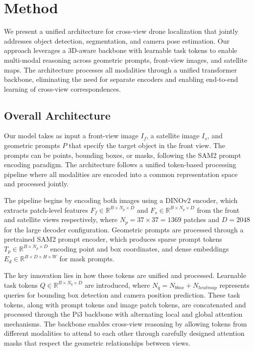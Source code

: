 \section{Method}

We present a unified architecture for cross-view drone localization that jointly addresses object detection, segmentation, and camera pose estimation. Our approach leverages a 3D-aware backbone with learnable task tokens to enable multi-modal reasoning across geometric prompts, front-view images, and satellite maps. The architecture processes all modalities through a unified transformer backbone, eliminating the need for separate encoders and enabling end-to-end learning of cross-view correspondences.

\subsection{Overall Architecture}

Our model takes as input a front-view image $I_f$, a satellite image $I_s$, and geometric prompts $P$ that specify the target object in the front view. The prompts can be points, bounding boxes, or masks, following the SAM2 prompt encoding paradigm. The architecture follows a unified token-based processing pipeline where all modalities are encoded into a common representation space and processed jointly.

The pipeline begins by encoding both images using a DINOv2 encoder, which extracts patch-level features $F_f \in \mathbb{R}^{B \times N_p \times D}$ and $F_s \in \mathbb{R}^{B \times N_p \times D}$ from the front and satellite views respectively, where $N_p = 37 \times 37 = 1369$ patches and $D = 2048$ for the large decoder configuration. Geometric prompts are processed through a pretrained SAM2 prompt encoder, which produces sparse prompt tokens $T_p \in \mathbb{R}^{B \times N_p \times D}$ encoding point and box coordinates, and dense embeddings $E_d \in \mathbb{R}^{B \times D \times H \times W}$ for mask prompts.

The key innovation lies in how these tokens are unified and processed. Learnable task tokens $Q \in \mathbb{R}^{B \times N_q \times D}$ are introduced, where $N_q = N_{bbox} + N_{heatmap}$ represents queries for bounding box detection and camera position prediction. These task tokens, along with prompt tokens and image patch tokens, are concatenated and processed through the Pi3 backbone with alternating local and global attention mechanisms. The backbone enables cross-view reasoning by allowing tokens from different modalities to attend to each other through carefully designed attention masks that respect the geometric relationships between views.

